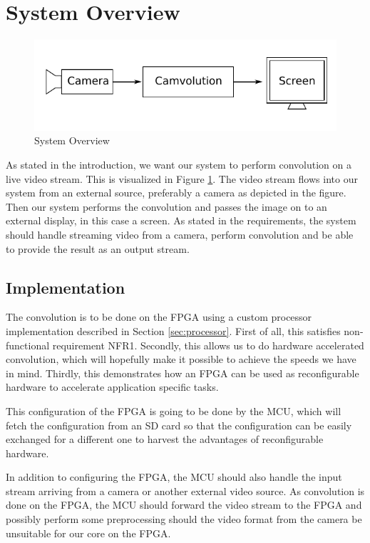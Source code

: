 \section{System Overview}


\begin{figure}[h]
    \centering
    \includegraphics{img/SystemOverview.pdf}
    \caption{System Overview}
    \label{fig:SystemOverview}
\end{figure}

As stated in the introduction, we want our system to perform convolution on a live video stream.
This is visualized in Figure \ref{fig:SystemOverview}.
The video stream flows into our system from an external source, preferably a camera as depicted in the figure.
Then our system performs the convolution and passes the image on to an external display, in this case a screen.
As stated in the requirements, the system should handle streaming video from a camera, perform convolution and be able to provide the result as an output stream.

\subsection{Implementation}
The convolution is to be done on the FPGA using a custom processor implementation described in Section \ref{sec:processor}.
First of all, this satisfies non-functional requirement NFR1.
Secondly, this allows us to do hardware accelerated convolution, which will hopefully make it possible to achieve the speeds we have in mind.
Thirdly, this demonstrates how an FPGA can be used as reconfigurable hardware to accelerate application specific tasks.

This configuration of the FPGA is going to be done by the MCU, which will fetch the configuration from an SD card so that the configuration can be easily exchanged for a different one to harvest the advantages of reconfigurable hardware.

In addition to configuring the FPGA, the MCU should also handle the input stream arriving from a camera or another external video source.
As convolution is done on the FPGA, the MCU should forward the video stream to the FPGA and possibly perform some preprocessing should the video format from the camera be unsuitable for our core on the FPGA.

